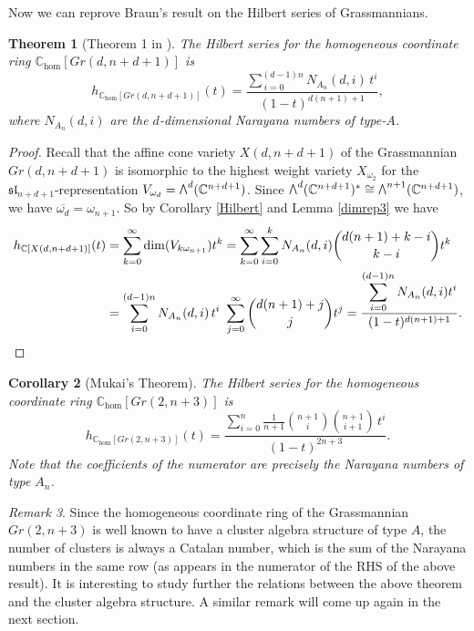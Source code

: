 \documentclass[12pt]{extarticle}
\theoremstyle{plain}
\newtheorem{theo}{Theorem}[section]
\newtheorem{coro}[theo]{Corollary}
\theoremstyle{definition}
\theoremstyle{remark}
\newtheorem{rema}[theo]{Remark}
\newcommand{\Wedge}{\scalebox{0.8}{\raisebox{0.4ex}{$\bigwedge$}}}
\newcommand{\slnnd}{\mathfrak{sl}_{n+d+1}}
\newcommand{\C}{\mathbb{C}}
\begin{document}
Now we can reprove Braun's result on the Hilbert series of Grassmannians.
\begin{theo}[Theorem 1 in \cite{Braun}]\label{Gr} 
    The Hilbert series for the homogeneous coordinate ring $\C_{\textrm{hom}}[Gr(d,n+d+1)]$ is
    $$
        h_{\C_{\textrm{hom}}[Gr(d,n+d+1)]}(t)=\frac{\sum_{\ i=0}^{(d-1)n} N_{A_n}(d,i)\,t^i}{(1-t)^{d(n+1)+1}},
    $$
where $N_{A_n}(d,i)$ are the $d$-dimensional Narayana numbers of type-$A$.
\end{theo}
\begin{proof}
Recall that the affine cone variety $X(d,n+d+1)$ of the Grassmannian $Gr(d,n+d+1)$ is isomorphic to the highest weight variety $X_{\omega_2}$ for the $\slnnd$-representation $V_{\omega_d}=\Wedge^d(\C^{n+d+1})$. Since $\Wedge^d(\C^{n+d+1})^*\cong\Wedge^{n+1}(\C^{n+d+1})$, we have $\overline{\omega_d}=\omega_{n+1}$. So by Corollary \ref{Hilbert} and Lemma \ref{dimrep3} we have
    \begin{align*}
        h_{\C[X(d,n+d+1)]}(t)& =\sum_{k=0}^{\infty}\dim(V_{k\omega_{n+1}})t^k
        =\sum_{k=0}^{\infty}\sum_{i=0}^{k}N_{A_n}(d,i)\binom{d(n+1)+k-i}{k-i}t^k\\
        & =\sum_{i=0}^{(d-1)n}N_{A_n}(d,i)\,t^i\ \sum_{j=0}^{\infty}\binom{d(n+1)+j}{j}t^{j} =\frac{\displaystyle\sum_{i=0}^{(d-1)n}N_{A_n}(d,i)t^i}{(1-t)^{d(n+1)+1}}.\qedhere
    \end{align*}
\end{proof}



\begin{coro}[Mukai's Theorem]\label{ThmGrMukai}
    The Hilbert series for the homogeneous coordinate ring $\C_{\textrm{hom}}[Gr(2,n+3)]$ is
    $$
        h_{\C_{\textrm{hom}}[Gr(2,n+3)]}(t)=\frac{\sum_{i=0}^{n}\frac{1}{n+1}\binom{n+1}{i}\binom{n+1}{i+1}\,t^i}{(1-t)^{2n+3}}.
    $$
    Note that the coefficients of the numerator are precisely the Narayana numbers of type $A_n$.
\end{coro}
\begin{rema}\label{remGrMukai}\sloppy
    Since the homogeneous coordinate ring of the Grassmannian $Gr(2,n+3)$ is well known to have a cluster algebra structure of type $A$, the number of clusters is always a Catalan number, which is the sum of the Narayana numbers in the same row (as appears in the numerator of the RHS of the above result). It is interesting to study further the relations between the above theorem and the cluster algebra structure. A similar remark will come up again in the next section.
\end{rema}\fussy
\end{document}
